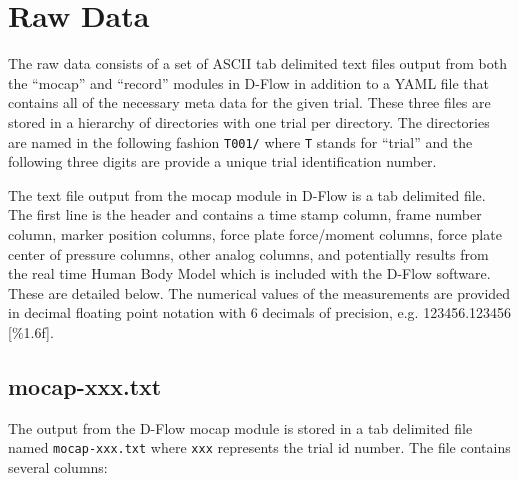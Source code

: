 \documentclass[10pt,a4paper,twocolumn]{article}
\begin{document}
\section*{Raw Data}
%
The raw data consists of a set of ASCII tab delimited text files output from
both the ``mocap'' and ``record'' modules in D-Flow in addition to a YAML file
that contains all of the necessary meta data for the given trial. These three
files are stored in a hierarchy of directories with one trial per directory.
The directories are named in the following fashion \verb+T001/+ where \verb+T+
stands for ``trial'' and the following three digits are provide a unique trial
identification number.

The text file output from the mocap module in D-Flow is a tab delimited file.
The first line is the header and contains a time stamp column, frame number
column, marker position columns, force plate force/moment columns, force plate
center of pressure columns, other analog columns, and potentially results from
the real time Human Body Model \cite{Bogert2013} which is included with the
D-Flow software. These are detailed below. The numerical values of the
measurements are provided in decimal floating point notation with 6 decimals of
precision, e.g. 123456.123456 [\%1.6f].

\subsection*{mocap-xxx.txt}

The output from the D-Flow mocap module is stored in a tab delimited file named
\verb+mocap-xxx.txt+ where \verb+xxx+ represents the trial id number. The file
contains several columns:
\end{document}
